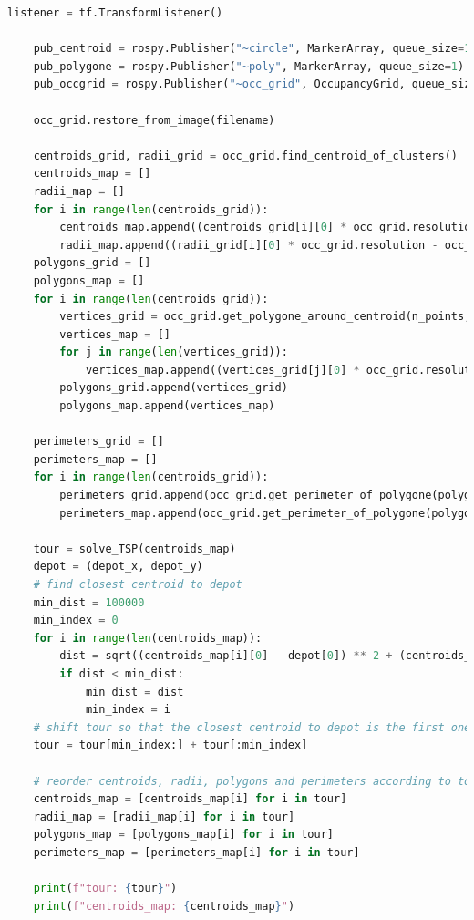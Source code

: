 \documentclass[francais,RandD]{rapportPFE}
\begin{document}
\begin{lstlisting}[language=Python,caption={Implémentation de l'algorithme d'investigation polygonale},label=lst:investigation_polygonale]
	listener = tf.TransformListener()

	pub_centroid = rospy.Publisher("~circle", MarkerArray, queue_size=1)
	pub_polygone = rospy.Publisher("~poly", MarkerArray, queue_size=1)
	pub_occgrid = rospy.Publisher("~occ_grid", OccupancyGrid, queue_size=1)

	occ_grid.restore_from_image(filename)

	centroids_grid, radii_grid = occ_grid.find_centroid_of_clusters()
	centroids_map = []
	radii_map = []
	for i in range(len(centroids_grid)):
		centroids_map.append((centroids_grid[i][0] * occ_grid.resolution - occ_grid.width / 2.0, centroids_grid[i][1] * occ_grid.resolution - occ_grid.height / 2.0))
		radii_map.append((radii_grid[i][0] * occ_grid.resolution - occ_grid.width / 2.0, radii_grid[i][1] * occ_grid.resolution - occ_grid.height / 2.0, radii_grid[i][2] * occ_grid.resolution, radii_grid[i][3] * occ_grid.resolution))
	polygons_grid = []
	polygons_map = []
	for i in range(len(centroids_grid)):
		vertices_grid = occ_grid.get_polygone_around_centroid(n_points, centroids_grid[i], radii_grid[i][2:4] / 2.0, scale, delta)
		vertices_map = []
		for j in range(len(vertices_grid)):
			vertices_map.append((vertices_grid[j][0] * occ_grid.resolution - occ_grid.width / 2.0, vertices_grid[j][1] * occ_grid.resolution - occ_grid.height / 2.0))
		polygons_grid.append(vertices_grid)
		polygons_map.append(vertices_map)

	perimeters_grid = []
	perimeters_map = []
	for i in range(len(centroids_grid)):
		perimeters_grid.append(occ_grid.get_perimeter_of_polygone(polygons_grid[i]))
		perimeters_map.append(occ_grid.get_perimeter_of_polygone(polygons_map[i]))

	tour = solve_TSP(centroids_map)
	depot = (depot_x, depot_y)
	# find closest centroid to depot
	min_dist = 100000
	min_index = 0
	for i in range(len(centroids_map)):
		dist = sqrt((centroids_map[i][0] - depot[0]) ** 2 + (centroids_map[i][1] - depot[1]) ** 2)
		if dist < min_dist:
			min_dist = dist
			min_index = i
	# shift tour so that the closest centroid to depot is the first one
	tour = tour[min_index:] + tour[:min_index]

	# reorder centroids, radii, polygons and perimeters according to tour
	centroids_map = [centroids_map[i] for i in tour]
	radii_map = [radii_map[i] for i in tour]
	polygons_map = [polygons_map[i] for i in tour]
	perimeters_map = [perimeters_map[i] for i in tour]

	print(f"tour: {tour}")
	print(f"centroids_map: {centroids_map}")


\end{lstlisting}
\end{document}
